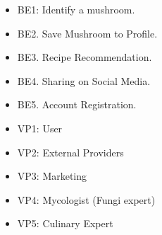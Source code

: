 \documentclass{article}
\begin{document}
\begin{itemize}
	\item BE1: Identify a mushroom.
 	\item BE2. Save Mushroom to Profile.
 	\item BE3. Recipe Recommendation.
 	\item BE4. Sharing on Social Media.
 	\item BE5. Account Registration.
\end{itemize}

\newpage
{} 

\begin{itemize}
	\item VP1: User
	\item VP2: External Providers
	\item VP3: Marketing
	\item VP4: Mycologist (Fungi expert)
	\item VP5: Culinary Expert
\end{itemize}
\end{document}
